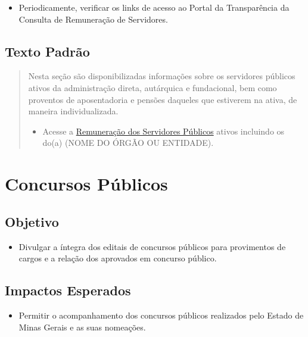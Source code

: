 \documentclass[
]{book}
\providecommand{\tightlist}{%
  \setlength{\itemsep}{0pt}\setlength{\parskip}{0pt}}
\begin{document}
\begin{itemize}
\tightlist
\item
  Periodicamente, verificar os links de acesso ao Portal da Transparência da Consulta de Remuneração de Servidores.
\end{itemize}

\hypertarget{texto-padruxe3o-8}{%
\subsection{Texto Padrão}\label{texto-padruxe3o-8}}

\begin{quote}
Nesta seção são disponibilizadas informações sobre os servidores públicos ativos da administração direta, autárquica e fundacional, bem como proventos de aposentadoria e pensões daqueles que estiverem na ativa, de maneira individualizada.

\begin{itemize}
\tightlist
\item
  Acesse a \href{http://www.transparencia.mg.gov.br/estado-pessoal/remuneracao-dos-servidores}{Remuneração dos Servidores Públicos} ativos incluindo os do(a) (NOME DO ÓRGÃO OU ENTIDADE).
\end{itemize}
\end{quote}

\hypertarget{concursos-puxfablicos}{%
\section{Concursos Públicos}\label{concursos-puxfablicos}}

\hypertarget{objetivo-8}{%
\subsection{Objetivo}\label{objetivo-8}}

\begin{itemize}
\tightlist
\item
  Divulgar a íntegra dos editais de concursos públicos para provimentos de cargos e a relação dos aprovados em concurso público.
\end{itemize}

\hypertarget{impactos-esperados-9}{%
\subsection{Impactos Esperados}\label{impactos-esperados-9}}

\begin{itemize}
\tightlist
\item
  Permitir o acompanhamento dos concursos públicos realizados pelo Estado de Minas Gerais e as suas nomeações.
\end{itemize}
\end{document}

